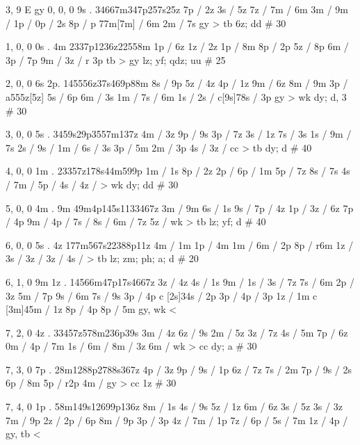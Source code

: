 3, 9
E
gy
0, 0, 0
9s . 
34667m347p257s25z
7p / 2z
3s / 5z
7z / 
7m / 6m
3m / 
9m / 
1p / 
0p / 2s
8p / 
p 77m[7m] / 6m
2m / 7s
gy > tb 
6z; dd # 30 

1, 0, 0
0s . 4m 
2337p1236z22558m
1p / 6z
1z / 2z 
1p / 8m
8p / 2p 
5z / 8p
6m /
3p / 7p 
9m / 
3z / r 3p 
tb > gy 
lz; yf; qdz; uu # 25

2, 0, 0 
6s 2p.
145556z37s469p88m
8s / 9p
5z / 4z
4p / 1z 
9m / 6z
8m / 9m
3p / a555z[5z]
5s / 6p
6m / 3s 
1m / 
7s / 6m
1s / 
2s / 
c[9s]78s / 3p
gy > wk
dy; d, 3 # 30 

3, 0, 0
5s .
3459s29p3557m137z
4m / 3z 
9p / 9s
3p / 7z
3s / 1z 
7s / 3s 
1s / 
9m / 7s 
2s /
9s / 
1m / 
6s / 3s 
3p / 5m 
2m / 3p 
4s / 
3z / 
cc > tb 
dy; d # 40 

4, 0, 0 
1m . 
23357z178s44m599p
1m / 1s 
8p / 2z 
2p / 
6p / 1m 
5p / 7z 
8s / 7s 
4s / 
7m / 
5p / 
4s / 
4z / 
> wk 
dy; dd # 30 

5, 0, 0 
4m . 9m 
49m4p145s1133467z
3m / 9m
6s / 1s 
9s / 
7p / 4z 
1p / 
3z / 6z 
7p / 4p 
9m / 
4p / 
7s / 
8s / 
6m / 7z 
5z / 
wk > tb 
lz; yf; d # 40 

6, 0, 0
5s . 4z 
177m567s22388p11z
4m / 1m 
1p / 4m 
1m / 
6m / 2p
8p / r6m 
1z / 
3s / 
3z / 
3z / 
4s / 
> tb 
lz; zm; ph; a; d # 20 

6, 1, 0 
9m 1z . 
14566m47p17s4667z
3z / 4z 
4s / 1s 
9m / 
1s / 
3s / 7z
7s / 6m 
2p / 3z
5m / 7p 
9s / 6m
7s / 9s 
3p / 4p 
c [2s]34s / 2p 
3p / 
4p / 3p 
1z / 1m 
c [3m]45m / 1z 
8p / 4p 
8p / 5m  
gy, wk < 

7, 2, 0
4z . 
33457z578m236p39s
3m / 4z 
6z / 9s 
2m / 5z 
3z / 7z 
4s / 5m 
7p / 6z 
0m / 
4p / 7m 
1s / 
6m / 
8m / 3z 
6m / 
wk > cc 
dy; a # 30 

7, 3, 0 
7p . 
28m1288p2788s367z
4p / 3z
9p / 
9s / 1p 
6z / 7z 
7s / 2m 
7p / 
9s / 2s 
6p / 8m 
5p / r2p 
4m / 
gy > cc 
1z # 30 

7, 4, 0 
1p . 
58m149s12699p136z
8m / 1s 
4s / 9s 
5z / 1z 
6m / 6z 
3s / 5z 
3s / 3z 
7m / 9p 
2z / 
2p / 6p 
8m / 9p
3p / 3p 
4z / 
7m / 1p 
7z / 
6p / 
5s / 7m
1z /
4p / 
gy, tb <